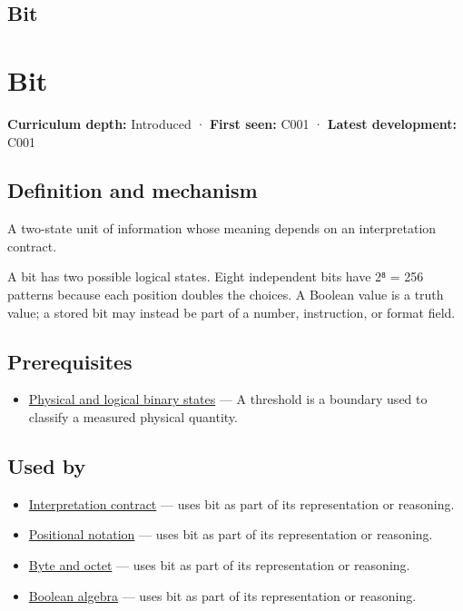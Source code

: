 \hypertarget{appendix-ddbb69998a2e}{}
\section*{Bit}
\chapter{Bit}\label{appendix-ddbb69998a2e-bit}

\textbf{Curriculum depth:} Introduced · \textbf{First seen:} C001 · \textbf{Latest development:} C001

\section{Definition and mechanism}\label{appendix-ddbb69998a2e-definition-and-mechanism}

A two-state unit of information whose meaning depends on an interpretation contract.

A bit has two possible logical states. Eight independent bits have 2⁸ = 256 patterns because each position doubles the choices. A Boolean value is a truth value; a stored bit may instead be part of a number, instruction, or format field.

\section{Prerequisites}\label{appendix-ddbb69998a2e-prerequisites}

\begin{itemize}
\tightlist
\item
  \hyperref[appendix-ea798b1ceb35]{Physical and logical binary states} --- A threshold is a boundary used to classify a measured physical quantity.
\end{itemize}

\section{Used by}\label{appendix-ddbb69998a2e-used-by}

\begin{itemize}
\tightlist
\item
  \hyperref[appendix-f414bd4ed05c]{Interpretation contract} --- uses bit as part of its representation or reasoning.
\item
  \hyperref[appendix-83c3f28f7bda]{Positional notation} --- uses bit as part of its representation or reasoning.
\item
  \hyperref[appendix-5bee2df85484]{Byte and octet} --- uses bit as part of its representation or reasoning.
\item
  \hyperref[appendix-24475e1596a8]{Boolean algebra} --- uses bit as part of its representation or reasoning.
\end{itemize}

